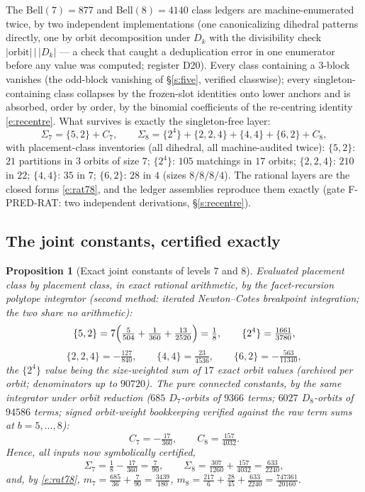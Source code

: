 \documentclass[11pt]{article}
\numberwithin{equation}{section}
\newtheorem{proposition}[theorem]{Proposition}
\theoremstyle{definition}
\theoremstyle{remark}
\begin{document}
The Bell$(7)=877$ and Bell$(8)=4140$ class ledgers are
machine-enumerated twice, by two independent implementations
(one canonicalizing dihedral patterns directly, one by orbit
decomposition under $D_k$ with the divisibility check
$|\mathrm{orbit}|\,\big|\,|D_k|$ --- a check that caught a
deduplication error in one enumerator before any value was
computed; register D20). Every class containing a $3$-block
vanishes (the odd-block vanishing of \S\ref{s:five}, verified
classwise); every singleton-containing class collapses by the
frozen-slot identities onto lower anchors and is absorbed,
order by order, by the binomial coefficients of the
re-centring identity \eqref{e:recentre}. What survives is
exactly the singleton-free layer:
\[
\Sigma_7=\{5,2\}+C_7,
\qquad
\Sigma_8=\{2^4\}+\{2,2,4\}+\{4,4\}+\{6,2\}+C_8,
\]
with placement-class inventories (all dihedral, all
machine-audited twice): $\{5,2\}$: $21$ partitions in $3$
orbits of size $7$; $\{2^4\}$: $105$ matchings in $17$ orbits;
$\{2,2,4\}$: $210$ in $22$; $\{4,4\}$: $35$ in $7$; $\{6,2\}$:
$28$ in $4$ (sizes $8/8/8/4$). The rational layers are the
closed forms \eqref{e:rat78}, and the ledger assemblies
reproduce them exactly (gate F-PRED-RAT: two independent
derivations, \S\ref{s:recentre}).

\subsection{The joint constants, certified
exactly}\label{s:seven:conn}

\begin{proposition}[Exact joint constants of levels $7$ and
$8$]\label{p:joints78}
Evaluated placement class by placement class, in exact rational
arithmetic, by the facet-recursion polytope integrator (second
method: iterated Newton--Cotes breakpoint integration; the two
share no arithmetic):
\[
\{5,2\}=7\Bigl(\tfrac5{504}+\tfrac1{360}+\tfrac{13}{2520}\Bigr)
=\tfrac18,
\qquad
\{2^4\}=\tfrac{1661}{3780},
\]
\[
\{2,2,4\}=-\tfrac{127}{840},\qquad
\{4,4\}=\tfrac{23}{4536},\qquad
\{6,2\}=-\tfrac{563}{11340},
\]
the $\{2^4\}$ value being the size-weighted sum of $17$ exact
orbit values (archived per orbit; denominators up to $90720$).
The pure connected constants, by the same integrator under
orbit reduction ($685$ $D_7$-orbits of $9366$ terms; $6027$
$D_8$-orbits of $94586$ terms; signed orbit-weight bookkeeping
verified against the raw term sums at $b=5,\dots,8$):
\[
C_7=-\tfrac{17}{360},
\qquad
C_8=\tfrac{157}{4032}.
\]
Hence, all inputs now symbolically certified,
\[
\Sigma_7=\tfrac18-\tfrac{17}{360}=\tfrac7{90},
\qquad
\Sigma_8=\tfrac{307}{1260}+\tfrac{157}{4032}=\tfrac{633}{2240},
\]
and, by \eqref{e:rat78},
$m_7=\tfrac{685}{36}+\tfrac7{90}=\tfrac{3439}{180}$,
$m_8=\tfrac{217}6+\tfrac{28}{45}+\tfrac{633}{2240}
=\tfrac{747361}{20160}$.
\end{proposition}
\end{document}

